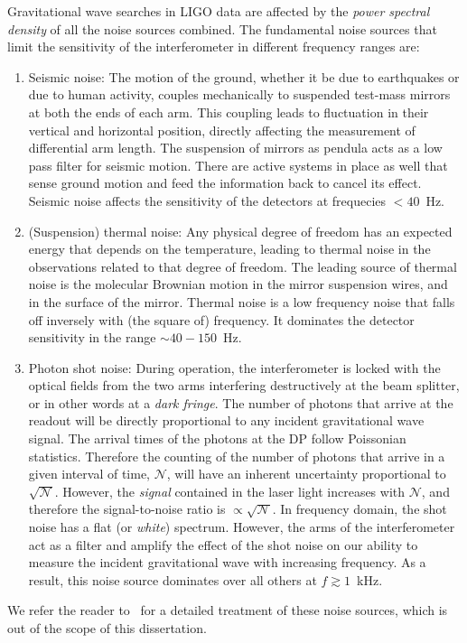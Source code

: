 Gravitational wave searches in LIGO data are affected by the {\it power
spectral density} of all the noise sources combined. The fundamental noise 
sources that limit the sensitivity of the interferometer in different frequency
ranges are:
% 
\begin{enumerate}
 \item Seismic noise:
 The motion of the ground, whether it be due to earthquakes or due to human 
 activity, couples mechanically to suspended test-mass mirrors at both the ends
 of each arm. This coupling leads to fluctuation in their vertical and horizontal
 position, directly affecting the measurement of differential arm length.
 The suspension of mirrors as pendula acts as a low pass filter for seismic
 motion. There are active systems in place as well that sense ground motion and 
 feed the information back to cancel its effect. Seismic noise affects the 
 sensitivity of the detectors at frequecies  $< 40$~Hz.
 \item (Suspension) thermal noise:
 Any physical degree of freedom has an expected energy that depends on the temperature,
 leading to thermal noise in the observations related to that degree of freedom.
 The leading source of thermal noise is the molecular Brownian motion in the
 mirror suspension wires, and in the surface of the mirror. Thermal noise is 
 a low frequency noise that falls off inversely with (the square of) frequency. 
 It dominates  the detector sensitivity in the range $\sim 40-150$~Hz.
 \item Photon shot noise:
 During operation, the interferometer is locked 
 with the optical fields from the two arms interfering destructively at the
 beam splitter, or in other words at a {\it dark fringe}. The number of photons
 that arrive at the readout will be directly proportional to any incident
 gravitational wave signal. The arrival times of the photons at the DP 
 follow Poissonian statistics. Therefore the counting of the number of
 photons that arrive in a given interval of time, $\mathcal{N}$, will have an 
 inherent uncertainty proportional to $\sqrt{\mathcal{N}}$. However, the {\it signal}
 contained in the laser light increases with $\mathcal{N}$, and therefore the 
 signal-to-noise ratio is $\propto \sqrt{\mathcal{N}}$.
 In frequency domain, the shot noise has a flat (or {\it white}) spectrum. 
 However, the arms of the interferometer act as a filter and amplify the effect
 of the shot noise on our ability to measure the incident gravitational wave
 with increasing frequency. As a result, this noise source dominates over all
 others at $f\gtrsim 1$~kHz.
\end{enumerate}
% 
We refer the reader to~\cite{Saulson:1995zi} for a detailed treatment of these
noise sources, which is out of the scope of this dissertation. 

